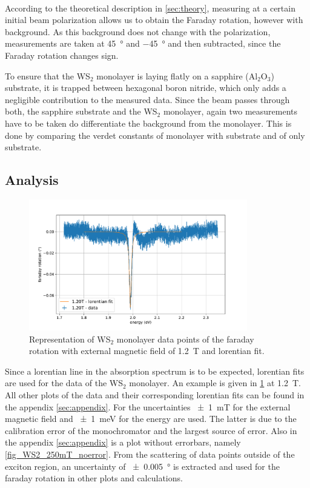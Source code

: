 \

According to the theoretical description in \cref{sec:theory}, measuring at a certain initial beam polarization allows us to obtain the Faraday rotation, however with background.
As this background does not change with the polarization, measurements are taken at \SI{+45}{\degree} and \SI{-45}{\degree} and then subtracted, since the Faraday rotation changes sign.

To ensure that the WS$_2$ monolayer is laying flatly on a sapphire ($\text{Al}_2\text{O}_3$) substrate, it is trapped between hexagonal boron nitride, which only adds a negligible contribution to the measured data.
Since the beam passes through both, the sapphire substrate and the WS$_2$ monolayer, again two measurements have to be taken do differentiate the background from the monolayer.
This is done by comparing the verdet constants of monolayer with substrate and of only substrate.

\subsection{Analysis}

\begin{figure}[!ht]
    \centering
    \includegraphics[width=0.85\textwidth]{plots/WS2_1200mT.pdf}
    \caption{Representation of WS$_2$ monolayer data points of the faraday rotation with external magnetic field of \SI{1.2}{\tesla} and lorentian fit.}
    \label{fig_WS2_1200mT}
\end{figure}
Since a lorentian line in the absorption spectrum is to be expected, lorentian fits are used for the data of the WS$_2$ monolayer.
An example is given in \cref{fig_WS2_1200mT} at \SI{1.2}{\tesla}.
All other plots of the data and their corresponding lorentian fits can be found in the appendix \cref{sec:appendix}.
For the uncertainties \SI{+-1}{\milli\tesla} for the external magnetic field and \SI{+-1}{\milli\electronvolt} for the energy are used.
The latter is due to the calibration error of the monochromator and the largest source of error.
Also in the appendix \cref{sec:appendix} is a plot without errorbars, namely \cref{fig_WS2_250mT_noerror}.
From the scattering of data points outside of the exciton region, an uncertainty of \SI{+-0.005}{\degree} is extracted and used for the faraday rotation in other plots and calculations.

